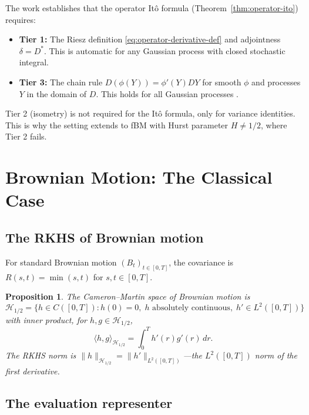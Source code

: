 \documentclass[12pt]{article}
\theoremstyle{plain}
\newtheorem{proposition}[theorem]{Proposition}
\theoremstyle{definition}
\theoremstyle{remark}
\newcommand{\HH}{\mathcal{H}}
\begin{document}
The work \cite{Fontes2026d} establishes that the operator It\^{o} formula (Theorem~\ref{thm:operator-ito}) requires:
\begin{itemize}
\item \textbf{Tier 1:} The Riesz definition \eqref{eq:operator-derivative-def} and adjointness $\delta = D^*$. This is automatic for any Gaussian process with closed stochastic integral.
\item \textbf{Tier 3:} The chain rule $D(\phi(Y)) = \phi'(Y) DY$ for smooth $\phi$ and processes $Y$ in the domain of $D$. This holds for all Gaussian processes \cite[Theorem 5.1]{Fontes2026d}.
\end{itemize}
Tier 2 (isometry) is not required for the It\^{o} formula, only for variance identities. This is why the setting extends to fBM with Hurst parameter $H \neq 1/2$, where Tier 2 fails.

\section{Brownian Motion: The Classical Case}\label{sec:BM}

\subsection{The RKHS of Brownian motion}

For standard Brownian motion $(B_t)_{t \in [0,T]}$, the covariance is $R(s,t) = \min(s,t)$ for $s, t \in [0,T]$.

\begin{proposition}\label{prop:BM-RKHS}
The Cameron--Martin space of Brownian motion is
\begin{equation}\label{eq:BM-CM-space}
\HH_{1/2} = \bigl\{h \in C([0,T]) : h(0) = 0, \; h \text{ absolutely continuous}, \; h' \in L^2([0,T])\bigr\}
\end{equation}
with inner product, for $h, g \in \HH_{1/2}$,
\begin{equation}\label{eq:BM-CM-inner-product}
\langle h, g \rangle_{\HH_{1/2}} = \int_0^T h'(r) g'(r)\,dr.
\end{equation}
The RKHS norm is $\|h\|_{\HH_{1/2}} = \|h'\|_{L^2([0,T])}$---the $L^2([0,T])$ norm of the first derivative.
\end{proposition}

\subsection{The evaluation representer}
\end{document}
